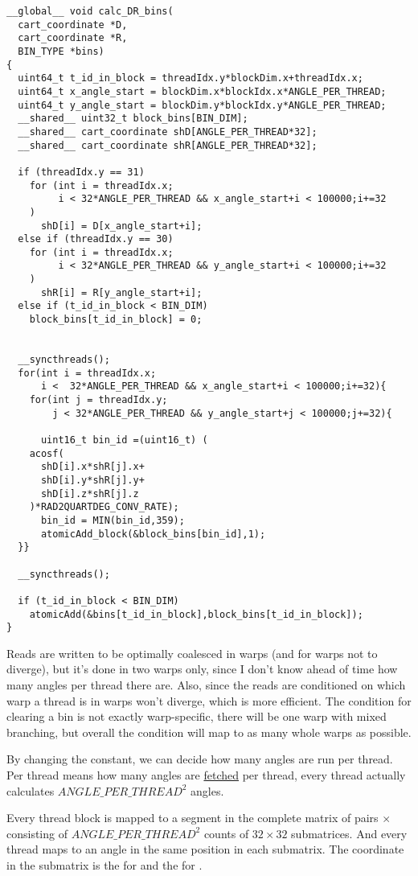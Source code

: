 \documentclass[a4paper,titlepage,12pt]{article}
\begin{document}
\begin{description}[left = \parindent]
\begin{lstlisting}
__global__ void calc_DR_bins(
  cart_coordinate *D,
  cart_coordinate *R,
  BIN_TYPE *bins)
{
  uint64_t t_id_in_block = threadIdx.y*blockDim.x+threadIdx.x;
  uint64_t x_angle_start = blockDim.x*blockIdx.x*ANGLE_PER_THREAD;
  uint64_t y_angle_start = blockDim.y*blockIdx.y*ANGLE_PER_THREAD;
  __shared__ uint32_t block_bins[BIN_DIM];
  __shared__ cart_coordinate shD[ANGLE_PER_THREAD*32];
  __shared__ cart_coordinate shR[ANGLE_PER_THREAD*32];

  if (threadIdx.y == 31)
    for (int i = threadIdx.x;
    	 i < 32*ANGLE_PER_THREAD && x_angle_start+i < 100000;i+=32
    )
      shD[i] = D[x_angle_start+i];
  else if (threadIdx.y == 30)
    for (int i = threadIdx.x;
    	 i < 32*ANGLE_PER_THREAD && y_angle_start+i < 100000;i+=32
    )
      shR[i] = R[y_angle_start+i];
  else if (t_id_in_block < BIN_DIM)
    block_bins[t_id_in_block] = 0;
  

  __syncthreads();
  for(int i = threadIdx.x;
      i <  32*ANGLE_PER_THREAD && x_angle_start+i < 100000;i+=32){
    for(int j = threadIdx.y;
        j < 32*ANGLE_PER_THREAD && y_angle_start+j < 100000;j+=32){

      uint16_t bin_id =(uint16_t) (
	acosf(
	  shD[i].x*shR[j].x+
	  shD[i].y*shR[j].y+
	  shD[i].z*shR[j].z
	)*RAD2QUARTDEG_CONV_RATE);
      bin_id = MIN(bin_id,359);
      atomicAdd_block(&block_bins[bin_id],1);
  }}

  __syncthreads();

  if (t_id_in_block < BIN_DIM)
    atomicAdd(&bins[t_id_in_block],block_bins[t_id_in_block]);
}
\end{lstlisting}

Reads are written to be optimally coalesced in warps (and for warps not to diverge), but it's done in two warps only, since I don't know ahead of time how many angles per thread there are.
Also, since the reads are conditioned on which warp a thread is in warps won't diverge, which is more efficient.
The condition for clearing a bin is not exactly warp-specific, there will be one warp with mixed branching, but overall the condition will map to as many whole warps as possible.

By changing the  constant, we can decide how many angles are run per thread.
Per thread means how many angles are \underline{fetched} per thread, every thread actually calculates \(ANGLE\_PER\_THREAD^2\) angles.

Every thread block is mapped to a segment in the complete matrix of pairs  \(\times\)  consisting of \(ANGLE\_PER\_THREAD^2\) counts of \(32 \times 32\) submatrices.
And every thread maps to an angle in the same position in each submatrix.
The coordinate in the submatrix is the  for  and the  for .


\end{description}
\end{document}
